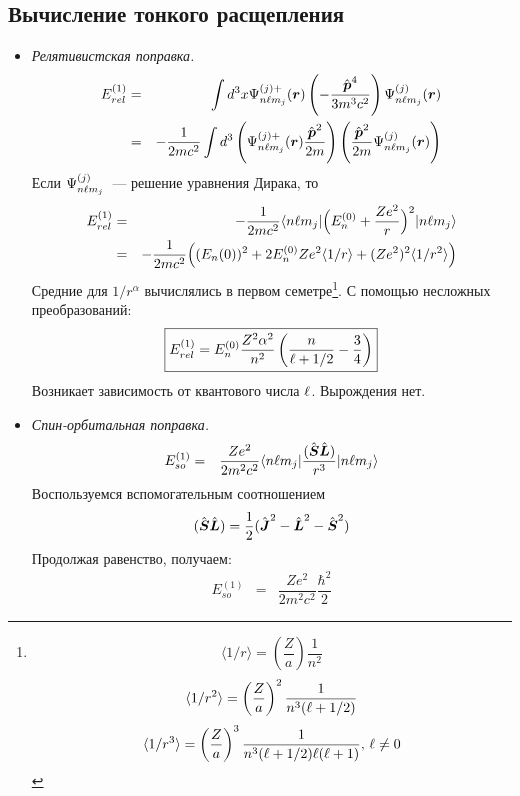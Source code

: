 \subsection{Вычисление тонкого расщепления}
\begin{itemize}
  \item \emph{Релятивистская поправка.}
  \begin{eqnarray*}
    E_{rel}^{(1)} &=& \int d^3 x \Psi_{n \l m_j}^{(j) +} (\bf r) \left(
        - \dfrac{\hat{\bf p}^4}{3 m^3 c^2}
    \right) \Psi_{n \l m_j}^{(j)} (\bf r)\\
    &=& -\dfrac{1}{2mc^2} \int d^3 \left(
        \Psi_{n \l m_j}^{(j) + }(\bf r) \dfrac{\hat{\bf p}^2}{2m} 
    \right)
    \left(
        \dfrac{\hat{\bf p}^2}{2m} \Psi_{n \l m_j}^{(j)} (\bf r)
    \right)
  \end{eqnarray*}
  Если $\Psi_{n \l m_j}^{(j)}$~--- решение уравнения Дирака, то
  \begin{eqnarray*}
    E^{(1)}_{rel} &=&-\dfrac{1}{2mc^2} \qtri
    {n \l m_j}
    { \Big( E_n^{(0)}  + \dfrac{Z e^2}{r} \Big)^2 }
    { n \l m_j }\\
    &=&
    -\dfrac{1}{2mc^2} \Big((E_n(0))^2  + 
        2 E_n^{(0)} Ze^2 \langle 1/r \rangle + (Ze^2)^2 \langle 1/r^2 \rangle
    \Big)
  \end{eqnarray*}
  Средние для $1/r^\alpha$ вычислялись в первом семетре\footnote{
  $$
    \langle 1/r \rangle = \left(\dfrac{Z}{a}\right) \dfrac{1}{n^2}
  $$
  $$
    \langle 1/r^2 \rangle = \left(\dfrac{Z}{a}\right)^2 \dfrac{1}{n^3 (\l + 1/2)}
  $$
  $$
    \langle 1/r^3 \rangle = \left(\dfrac{Z}{a}\right)^3 \dfrac{1}{n^3 (\l + 1/2) \l (\l + 1)}, \, \l \neq 0
  $$
  }.
  С помощью несложных преобразований:
  $$
    \boxed{
        E_{rel}^{(1)} = E_n^{(0)} \dfrac{Z^2 \alpha^2}{n^2} \left(
            \dfrac{n}{\l + 1/2} - \dfrac34
        \right)
    }
  $$
  Возникает зависимость от квантового числа $\l$. Вырождения нет.
  \item \emph{Спин-орбитальная поправка.} 
  \begin{eqnarray*}
    E_{so}^{(1)} &=& \dfrac{Ze^2}{2m^2c^2} 
    \qtri
    {n \l m_j}
    { \dfrac{(\hat{\bf S} \hat{\bf L})}{r^3} }
    {n \l m_j}
  \end{eqnarray*}
  Воспользуемся вспомогательным соотношением
  $$
    (\hat{\bf S} \hat{\bf L}) = \dfrac{1}{2} (\hat{\bf J}^2 - \hat{\bf L}^2 - \hat{\bf S}^2)
  $$
  Продолжая равенство, получаем:
  \begin{eqnarray*}
    E_{so}^{(1)} &=& \dfrac{Ze^2}{2m^2c^2} \dfrac{\hbar^2}{2}

\end{eqnarray*}
\end{itemize}
